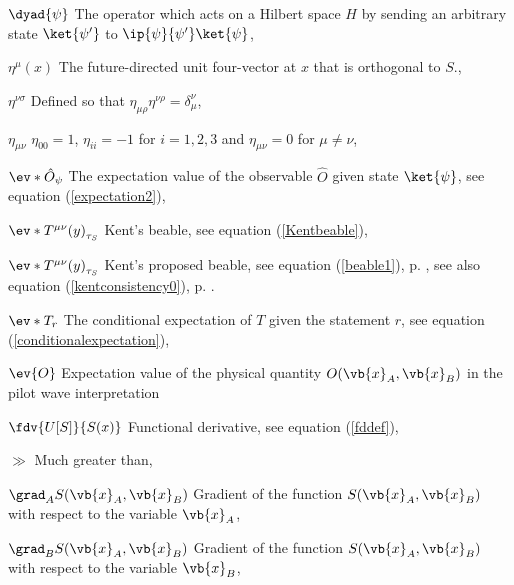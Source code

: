 \begin{thenomenclature}
      \item [{$\dyad{\psi}$}]\begingroup The operator which acts on a Hilbert space $H$ by sending an arbitrary state $\ket{\psi'}$ to $\ip{\psi}{\psi'}\ket{\psi}$, \nomrefpage{}
      \item [{$\eta^\mu(x)$}]\begingroup The future-directed  unit four-vector at $x$ that is orthogonal to $S$., \nomrefpage{}
      \item [{$\eta^{\nu\sigma}$}]\begingroup Defined so that  $\eta_{\mu\rho}\eta^{\nu\rho}=\delta^\nu_\mu$, \nomrefpage{}
      \item [{$\eta_{\mu\nu}$}]\begingroup $\eta_{00}=1$, $\eta_{ii}=-1$ for $i=1,2,3$ and $\eta_{\mu\nu}=0$ for $\mu\neq\nu$, \nomrefpage{}
      \item [{$\ev*{\hat{O}}_\psi$}]\begingroup The expectation value of the observable $\hat{O}$ given state $\ket{\psi}$, see equation (\ref{expectation2}), \nomrefpage{}
      \item [{$\ev*{T^{\mu\nu}(y)}_{\tau_S}$}]\begingroup Kent's beable, see equation (\ref{Kentbeable}), \nomrefpage{}
      \item [{$\ev*{T^{\mu\nu}(y)}_{\tau_S}$}]\begingroup Kent's proposed beable, see equation (\ref{beable1}), p. \pageref{beable1}, see also equation (\ref{kentconsistency0}), p. \pageref{kentconsistency0}.
      \item [{$\ev*{T}_r$}]\begingroup The conditional expectation of $T$ given the statement $r$, see equation (\ref{conditionalexpectation}), \nomrefpage{}
      \item [{$\ev{O}$}]\begingroup Expectation value of the physical quantity $O(\vb{x}_A, \vb{x}_B)$ in the pilot wave interpretation \nomrefpage{}
      \item [{$\fdv {U[S]}{S(x)}$}]\begingroup Functional derivative, see equation (\ref {fddef}), \nomrefpage {}
      \item [{$\gg$}]\begingroup Much greater than, \nomrefpage{}
      \item [{$\grad_A{S}(\vb{x}_A, \vb{x}_B)$}]\begingroup Gradient of the function ${S}(\vb{x}_A, \vb{x}_B)$ with respect to the variable $\vb{x}_A$, \nomrefpage{}
      \item [{$\grad_B{S}(\vb{x}_A, \vb{x}_B)$}]\begingroup Gradient of the function ${S}(\vb{x}_A, \vb{x}_B)$ with respect to the variable $\vb{x}_B$, \nomrefpage{}

\end{thenomenclature}
